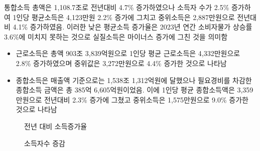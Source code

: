 \documentclass[
  a4paper,
  oneside,
  open=any]{scrbook}
\begin{document}
통합소득 총액은 1,108.7조로 전년대비 4.7\% 증가하였으나 소득자 수가
2.5\% 증가하여 1인당 평균소득은 4,123만원 2.2\% 증가에 그치고 중위소득은
2,887만원으로 전년대비 4.1\% 증가하였음. 이러한 낮은 평균소득 증가율은
2023년 연간 소비자물가 상승률 3.6\%에 미치지 못하는 것으로 실질소득은
마이너스 증가에 그친 것을 의미함

\begin{itemize}
\item
  근로소득은 총액 903조 3,839억원으로 1인당 평균 근로소득은
  4,332만원으로 2.8\% 증가하였으며 중위값은 3,272만원으로 4.4\% 증가한
  것으로 나타남
\item
  종합소득은 매출액 기준으로는 1,538조 1,312억원에 달했으나 필요경비를
  차감한 종합소득 금액은 총 385억 6,605억원이었음. 이에 1인당 평균
  종합소득액은 3,359만원으로 전년대비 2.3\% 증가에 그쳤고 중위소득은
  1,575만원으로 9.0\% 증가한 것으로 나타남
\end{itemize}

\begin{figure}

\caption{\label{fig-inc}전년 대비 소득증가율}


\end{figure}%

\begin{figure}

\caption{\label{fig-pinc}소득자수 증감}


\end{figure}%
\end{document}

